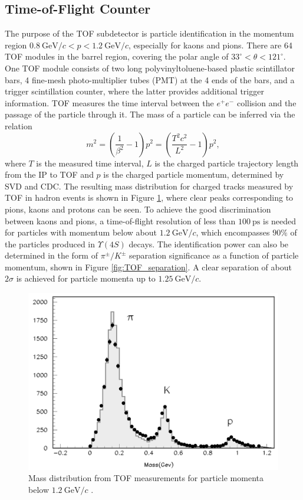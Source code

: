 \documentclass[headings=standardclasses,headings=big,oneside,a4paper,openany,12pt]{scrbook}
\newcommand {\e}[1]{\mathrm{~#1}}
\begin{document}
\subsection{Time-of-Flight Counter}

The purpose of the TOF subdetector is particle identification in the momentum region $0.8\e{GeV}/c < p < 1.2\e{GeV}/c$, especially for kaons and pions. There are 64 TOF modules in the barrel region, covering the polar angle of $33^\circ < \theta < 121^\circ$. One TOF module consists of two long polyvinyltoluene-based plastic scintillator bars, 4 fine-mesh photo-multiplier tubes (PMT) at the 4 ends of the bars, and a trigger scintillation counter, where the latter provides additional trigger information. TOF measures the time interval between the $e^+e^-$ collision and the passage of the particle through it. The mass of a particle can be inferred via the relation
\begin{equation}
m^2 = \left( \frac{1}{\beta^2}-1\right)p^2 = \left( \frac{T^2c^2}{L^2}-1\right)p^2,
\end{equation}
where $T$ is the measured time interval, $L$ is the charged particle trajectory length from the IP to TOF and $p$ is the charged particle momentum, determined by SVD and CDC. The resulting mass distribution for charged tracks measured by TOF in hadron events is shown in Figure \ref{fig:TOF_mass}, where clear peaks corresponding to pions, kaons and protons can be seen. To achieve the good discrimination between kaons and pions, a time-of-flight resolution of less than $100\e{ps}$ is needed for particles with momentum below about $1.2\e{GeV}/c$, which encompasses $90\%$ of the particles produced in $\Upsilon(4S)$ decays. The identification power can also be determined in the form of $\pi^\pm/K^\pm$ separation significance as a function of particle momentum, shown in Figure \ref{fig:TOF_separation}. A clear separation of about $2\sigma$ is achieved for particle momenta up to $1.25\e{GeV}/c$.

\begin{figure}[H]
	\centering
	\captionsetup{width=0.8\linewidth}
	\includegraphics[width=0.6\linewidth]{fig/setup/TOF_mass}
	\caption{Mass distribution from TOF measurements for particle momenta below $1.2\e{GeV}/c$ \cite{ABASHIAN2002117}.}
	\label{fig:TOF_mass}
\end{figure}
\end{document}
